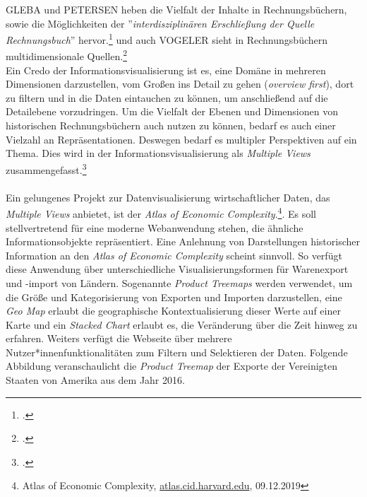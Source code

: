\documentclass[12pt,a4paper]{article}
\begin{document}
GLEBA und PETERSEN heben die Vielfalt der Inhalte in Rechnungsbüchern, sowie die Möglichkeiten der ''\textit{interdisziplinären Erschließung der Quelle Rechnungsbuch}'' hervor.\footcite[][S.7-10]{gleba2015wirtschafts} und auch VOGELER sieht in Rechnungsbüchern multidimensionale Quellen.\footcite[][]{vogeler2016content}
\\
Ein Credo der Informationsvisualisierung ist es, eine Domäne in mehreren Dimensionen darzustellen, vom Großen ins Detail zu gehen (\textit{overview first}), dort zu filtern und in die Daten eintauchen zu können, um anschließend auf die Detailebene vorzudringen. Um die Vielfalt der Ebenen und Dimensionen von historischen Rechnungsbüchern auch nutzen zu können, bedarf es auch einer Vielzahl an Repräsentationen. Deswegen bedarf es multipler Perspektiven auf ein Thema. Dies wird in der Informationsvisualisierung als \textit{Multiple Views} zusammengefasst.\footcite[][S.452-462]{preim2010interaktive}
\\
\\
Ein gelungenes Projekt zur Datenvisualisierung wirtschaftlicher Daten, das \textit{Multiple Views} anbietet, ist der \textit{Atlas of Economic Complexity}.\footnote{Atlas of Economic Complexity, \url{atlas.cid.harvard.edu}, 09.12.2019}. Es soll stellvertretend für eine moderne Webanwendung stehen, die ähnliche Informationsobjekte repräsentiert. Eine Anlehnung von Darstellungen historischer Information an den \textit{Atlas of Economic Complexity} scheint sinnvoll. So verfügt diese Anwendung über unterschiedliche Visualisierungsformen für Warenexport und -import von Ländern. Sogenannte \textit{Product Treemaps} werden verwendet, um die Größe und Kategorisierung von Exporten und Importen darzustellen, eine \textit{Geo Map} erlaubt die geographische Kontextualisierung dieser Werte auf einer Karte und ein \textit{Stacked Chart} erlaubt es, die Veränderung über die Zeit hinweg zu erfahren. Weiters verfügt die Webseite über mehrere Nutzer*innenfunktionalitäten zum Filtern und Selektieren der Daten. Folgende Abbildung veranschaulicht die \textit{Product Treemap} der Exporte der Vereinigten Staaten von Amerika aus dem Jahr 2016.
\end{document}

